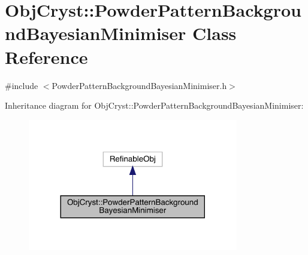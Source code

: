 \hypertarget{class_obj_cryst_1_1_powder_pattern_background_bayesian_minimiser}{}\section{Obj\+Cryst\+::Powder\+Pattern\+Background\+Bayesian\+Minimiser Class Reference}
\label{class_obj_cryst_1_1_powder_pattern_background_bayesian_minimiser}


{\ttfamily \#include $<$Powder\+Pattern\+Background\+Bayesian\+Minimiser.\+h$>$}



Inheritance diagram for Obj\+Cryst\+::Powder\+Pattern\+Background\+Bayesian\+Minimiser\+:
\nopagebreak
\begin{figure}[H]
\begin{center}
\leavevmode
\includegraphics[width=260pt]{class_obj_cryst_1_1_powder_pattern_background_bayesian_minimiser__inherit__graph}
\end{center}
\end{figure}



